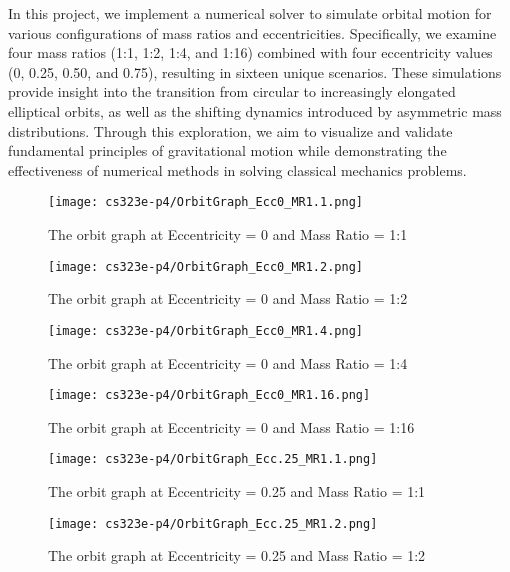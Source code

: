 \documentclass{article}
\begin{document}
In this project, we implement a numerical solver to simulate orbital motion for various configurations of mass ratios and eccentricities. Specifically, we examine four mass ratios (1:1, 1:2, 1:4, and 1:16) combined with four eccentricity values (0, 0.25, 0.50, and 0.75), resulting in sixteen unique scenarios. These simulations provide insight into the transition from circular to increasingly elongated elliptical orbits, as well as the shifting dynamics introduced by asymmetric mass distributions. Through this exploration, we aim to visualize and validate fundamental principles of gravitational motion while demonstrating the effectiveness of numerical methods in solving classical mechanics problems.



\begin{figure}
    \centering
    \texttt{[image: cs323e-p4/OrbitGraph\_Ecc0\_MR1.1.png]}
    \caption{The orbit graph at Eccentricity = 0 and Mass Ratio = 1:1}
    \label{fig:ecc0_mr1.1}
\end{figure}

\begin{figure}
    \centering
    \texttt{[image: cs323e-p4/OrbitGraph\_Ecc0\_MR1.2.png]}
    \caption{The orbit graph at Eccentricity = 0 and Mass Ratio = 1:2}
    \label{fig:ecc0_mr1.2}
\end{figure}

\begin{figure}
    \centering
    \texttt{[image: cs323e-p4/OrbitGraph\_Ecc0\_MR1.4.png]}
    \caption{The orbit graph at Eccentricity = 0 and Mass Ratio = 1:4}
    \label{fig:ecc0_mr1.4}
\end{figure}

\begin{figure}
    \centering
    \texttt{[image: cs323e-p4/OrbitGraph\_Ecc0\_MR1.16.png]}
    \caption{The orbit graph at Eccentricity = 0 and Mass Ratio = 1:16}
    \label{fig:ecc0_mr1.16}
\end{figure}

\begin{figure}
    \centering
    \texttt{[image: cs323e-p4/OrbitGraph\_Ecc.25\_MR1.1.png]}
    \caption{The orbit graph at Eccentricity = 0.25 and Mass Ratio = 1:1}
    \label{fig:ecc.25_mr1.1}
\end{figure}

\begin{figure}
    \centering
    \texttt{[image: cs323e-p4/OrbitGraph\_Ecc.25\_MR1.2.png]}
    \caption{The orbit graph at Eccentricity = 0.25 and Mass Ratio = 1:2}
    \label{fig:ecc.25_mr1.2}
\end{figure}
\end{document}
